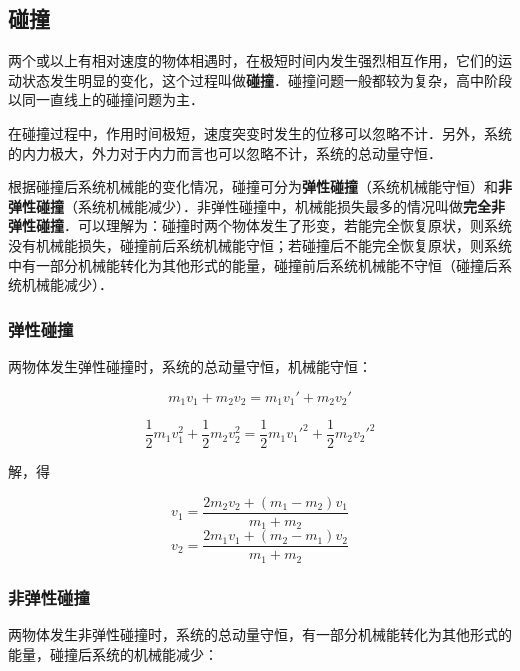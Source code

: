 \subsection{碰撞}

两个或以上有相对速度的物体相遇时，在极短时间内发生强烈相互作用，它们的运动状态发生明显的变化，这个过程叫做\textbf{碰撞}．碰撞问题一般都较为复杂，高中阶段以同一直线上的碰撞问题为主．

在碰撞过程中，作用时间极短，速度突变时发生的位移可以忽略不计．另外，系统的内力极大，外力对于内力而言也可以忽略不计，系统的总动量守恒．

根据碰撞后系统机械能的变化情况，碰撞可分为\textbf{弹性碰撞}（系统机械能守恒）和\textbf{非弹性碰撞}（系统机械能减少）．非弹性碰撞中，机械能损失最多的情况叫做\textbf{完全非弹性碰撞}．可以理解为：碰撞时两个物体发生了形变，若能完全恢复原状，则系统没有机械能损失，碰撞前后系统机械能守恒；若碰撞后不能完全恢复原状，则系统中有一部分机械能转化为其他形式的能量，碰撞前后系统机械能不守恒（碰撞后系统机械能减少）．

\subsubsection{弹性碰撞}

两物体发生弹性碰撞时，系统的总动量守恒，机械能守恒：

\begin{equation}
m_1v_1+m_2v_2=m_1v_1'+m_2v_2'
\end{equation}

\begin{equation}
\frac12m_1v_1^2+\frac12m_2v_2^2=\frac12m_1v_1'^2+\frac12m_2v_2'^2
\end{equation}

解，得

\begin{equation}
v_1= \frac{2m_2v_2 + (m_1 - m_2)v_1}{m_1+m_2}
\end{equation}
\begin{equation}
v_2= \frac{2m_1v_1 + (m_2 - m_1)v_2}{m_1+m_2}
\end{equation}



\subsubsection{非弹性碰撞}

两物体发生非弹性碰撞时，系统的总动量守恒，有一部分机械能转化为其他形式的能量，碰撞后系统的机械能减少：


